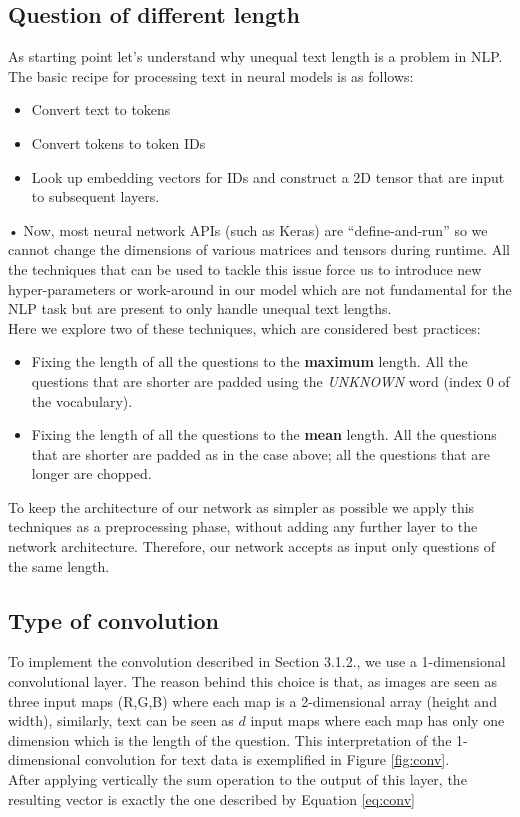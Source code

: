 \documentclass[10pt,twocolumn,letterpaper]{article}
\begin{document}
\subsection{Question of different length}
As starting point let's understand why unequal text length is a problem in NLP. The basic recipe for processing text in neural models is as follows:
\begin{itemize}\itemsep0.1pt
\item Convert text to tokens
\item Convert tokens to token IDs
\item Look up embedding vectors for IDs and construct a 2D tensor that are input to subsequent layers.
\end{itemize}•
Now, most neural network APIs (such as Keras) are “define-and-run” so we cannot change the dimensions of various matrices and tensors during runtime. All the techniques that can be used to tackle this issue force us to introduce new hyper-parameters or work-around in our model which are not fundamental for  the NLP task but are present to only handle unequal text lengths.\\
Here we explore two of these techniques, which are considered best practices:
\begin{itemize}
	\item Fixing the length of all the questions to the \textbf{maximum} length. All the questions that are shorter are padded using the \emph{UNKNOWN} word (index $0$ of the vocabulary).
	\item Fixing the length of all the questions to the \textbf{mean} length. All the questions that are shorter are padded as in the case above; all the questions that are longer are chopped.
\end{itemize}
To keep the architecture of our network as simpler as possible we apply this techniques as a preprocessing phase, without adding any further layer to the network architecture. Therefore, our network accepts as input only questions of the same length.\\

\subsection{Type of convolution}

To implement the convolution described in Section 3.1.2., we use a 1-dimensional convolutional layer. The reason behind this choice is that, as images are seen as three input maps (R,G,B) where each map is a 2-dimensional array (height and width), similarly, text can be seen as $d$ input maps where each map has only one dimension which is the length of the question. This interpretation of the 1-dimensional convolution for text data is exemplified in Figure \ref{fig:conv}.\\
After applying vertically the sum operation to the output of this layer, the resulting vector is exactly the one described by Equation \ref{eq:conv}    
\end{document}
